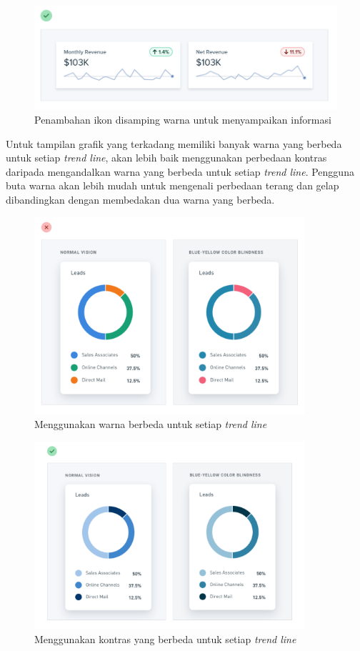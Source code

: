 \begin{figure}[H]
	{\centering
		\includegraphics[keepaspectratio, width=12cm]{gambar/g-106.png}
		\caption{Penambahan ikon disamping warna untuk menyampaikan informasi \citep{refactoringui}}}
	\label{gambar:g-106.png}
\end{figure}

Untuk tampilan grafik yang terkadang memiliki banyak warna yang berbeda untuk setiap \textit{trend line}, akan lebih baik menggunakan perbedaan kontras daripada mengandalkan warna yang berbeda untuk setiap \textit{trend line}. Pengguna buta warna akan lebih mudah untuk mengenali perbedaan terang dan gelap dibandingkan dengan membedakan dua warna yang berbeda.
\begin{figure}[H]
	{\centering
		\includegraphics[keepaspectratio, width=10cm]{gambar/g-107.png}
		\caption{Menggunakan warna berbeda untuk setiap \textit{trend line} \citep{refactoringui}}}
	\label{gambar:g-107.png}
\end{figure}
\begin{figure}[H]
	{\centering
		\includegraphics[keepaspectratio, width=10cm]{gambar/g-108.png}
		\caption{Menggunakan kontras yang berbeda untuk setiap \textit{trend line} \citep{refactoringui}}}
	\label{gambar:g-168.png}
\end{figure}



